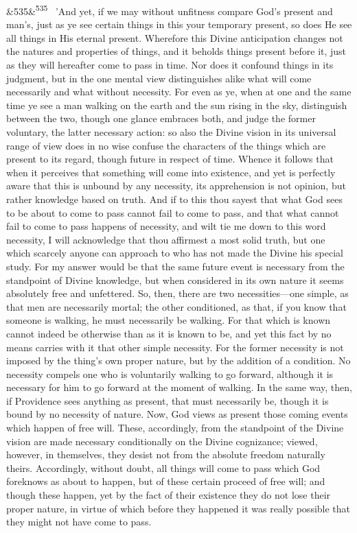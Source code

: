 \documentclass[12pt]{article}
\newcommand{\para}[1][]{\par\noindent\ifx&#1&\else\textsuperscript{\footnotesize #1}~\fi}
\begin{document}
\para[535] 'And yet, if we may without unfitness compare God's present and man's, just as ye see certain things in this your temporary present, so does He see all things in His eternal present. Wherefore this Divine anticipation changes not the natures and properties of things, and it beholds things present before it, just as they will hereafter come to pass in time. Nor does it confound things in its judgment, but in the one mental view distinguishes alike what will come necessarily and what without necessity. For even as ye, when at one and the same time ye see a man walking on the earth and the sun rising in the sky, distinguish between the two, though one glance embraces both, and judge the former voluntary, the latter necessary action: so also the Divine vision in its universal range of view does in no wise confuse the characters of the things which are present to its regard, though future in respect of time. Whence it follows that when it perceives that something will come into existence, and yet is perfectly aware that this is unbound by any necessity, its apprehension is not opinion, but rather knowledge based on truth. And if to this thou sayest that what God sees to be about to come to pass cannot fail to come to pass, and that what cannot fail to come to pass happens of necessity, and wilt tie me down to this word necessity, I will acknowledge that thou affirmest a most solid truth, but one which scarcely anyone can approach to who has not made the Divine his special study. For my answer would be that the same future event is necessary from the standpoint of Divine knowledge, but when considered in its own nature it seems absolutely free and unfettered. So, then, there are two necessities---one simple, as that men are necessarily mortal; the other conditioned, as that, if you know that someone is walking, he must necessarily be walking. For that which is known cannot indeed be otherwise than as it is known to be, and yet this fact by no means carries with it that other simple necessity. For the former necessity is not imposed by the thing's own proper nature, but by the addition of a condition. No necessity compels one who is voluntarily walking to go forward, although it is necessary for him to go forward at the moment of walking. In the same way, then, if Providence sees anything as present, that must necessarily be, though it is bound by no necessity of nature. Now, God views as present those coming events which happen of free will. These, accordingly, from the standpoint of the Divine vision are made necessary conditionally on the Divine cognizance; viewed, however, in themselves, they desist not from the absolute freedom naturally theirs. Accordingly, without doubt, all things will come to pass which God foreknows as about to happen, but of these certain proceed of free will; and though these happen, yet by the fact of their existence they do not lose their proper nature, in virtue of which before they happened it was really possible that they might not have come to pass.
\end{document}
